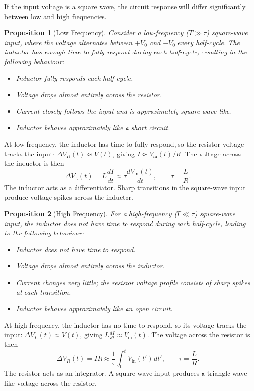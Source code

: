 \documentclass{article}
\newtheorem{proposition}{Proposition}
\begin{document}
If the input voltage is a square wave, the circuit response will differ significantly between low and high frequencies.
\begin{proposition}[Low Frequency]
    Consider a low-frequency ($T \gg \tau$) square-wave input, where the voltage alternates between $+V_0$ and $-V_0$ every half-cycle. The inductor has enough time to fully respond during each half-cycle, resulting in the following behaviour:
    \begin{itemize}
        \item Inductor fully responds each half-cycle.
        \item Voltage drops almost entirely across the resistor.
        \item Current closely follows the input and is approximately square-wave-like.
        \item Inductor behaves approximately like a short circuit.
    \end{itemize}
\end{proposition}
At low frequency, the inductor has time to fully respond, so the resistor voltage tracks the input: $\Delta V_R(t) \approx V(t)$, giving $I \approx V_{\text{in}}(t)/R$. The voltage across the inductor is then
\[\Delta V_L(t) = L\frac{dI}{dt} \approx \tau\frac{dV_{\text{in}}(t)}{dt}, \qquad \tau = \frac{L}{R}.\]
The inductor acts as a differentiator. Sharp transitions in the square-wave input produce voltage spikes across the inductor.
\begin{proposition}[High Frequency]
    For a high-frequency ($T \ll \tau$) square-wave input, the inductor does not have time to respond during each half-cycle, leading to the following behaviour:
    \begin{itemize}
        \item Inductor does not have time to respond.
        \item Voltage drops almost entirely across the inductor.
        \item Current changes very little; the resistor voltage profile consists of sharp spikes at each transition.
        \item Inductor behaves approximately like an open circuit.
    \end{itemize}
\end{proposition}
At high frequency, the inductor has no time to respond, so its voltage tracks the input: $\Delta V_L(t) \approx V(t)$, giving $L\frac{dI}{dt} \approx V_{\text{in}}(t)$. The voltage across the resistor is then
\[\Delta V_R(t) = IR \approx \frac{1}{\tau}\int_0^t V_{\text{in}}(t')\,dt', \qquad \tau = \frac{L}{R}.\]
The resistor acts as an integrator. A square-wave input produces a triangle-wave-like voltage across the resistor.
\end{document}
